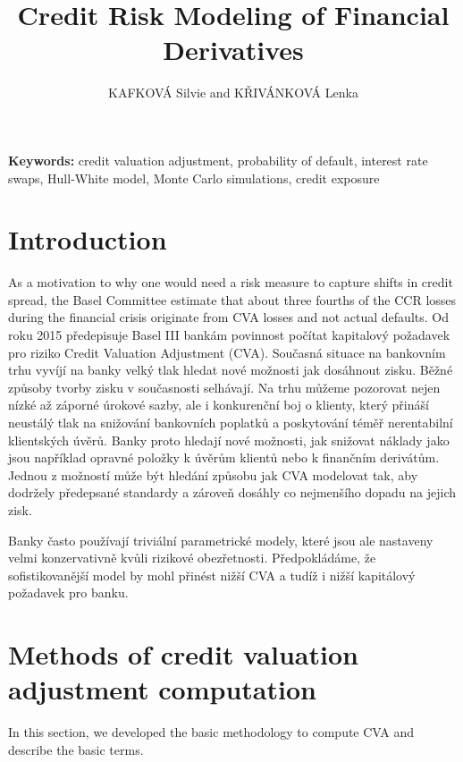 \documentclass{amsart}
\theoremstyle{definition}\newtheorem{definition}[theorem]{Definition}
\theoremstyle{remark}\newtheorem{remark}[theorem]{Remark}
\begin{document}
\title{Credit Risk Modeling of Financial Derivatives}
\author{KAFKOVÁ Silvie and KŘIVÁNKOVÁ Lenka}

\begin{abstract}
\end{abstract}
\maketitle

\noindent\textbf{Keywords:} credit valuation adjustment, probability of default, interest rate swaps, Hull-White model, Monte Carlo simulations, credit exposure

\bigskip

\section{Introduction}
As a motivation to why one would need a risk measure to capture shifts in credit spread, the Basel Committee estimate that about three fourths of the CCR losses during the financial crisis originate from CVA losses and not actual defaults.
\hfill
\newline
\newline
Od roku 2015 předepisuje Basel III bankám povinnost počítat kapitalový požadavek pro riziko Credit Valuation Adjustment (CVA).
Současná situace na bankovním trhu vyvíjí na banky velký tlak hledat nové možnosti jak dosáhnout zisku.
Běžné způsoby tvorby zisku v současnosti selhávají.
Na trhu můžeme pozorovat nejen nízké až záporné úrokové sazby, ale i konkurenční boj o klienty, který přináší neustálý tlak na snižování bankovních poplatků a poskytování téměř nerentabilní klientských úvěrů.
Banky proto hledají nové možnosti, jak snižovat náklady jako jsou například opravné položky k úvěrům klientů nebo k finančním derivátům.
Jednou z možností může být hledání způsobu jak CVA modelovat tak, aby dodržely předepsané standardy a zároveň dosáhly co nejmenšího dopadu na jejich zisk. 

Banky často používají triviální parametrické modely, které jsou ale nastaveny velmi konzervativně kvůli rizikové obezřetnosti.
Předpokládáme, že sofistikovanější model by mohl přinést nižší CVA a tudíž i nižší kapitálový požadavek pro banku. 


\section{Methods of credit valuation adjustment computation} 
In this section, we developed the basic methodology to compute CVA and describe the basic terms.
\end{document}
